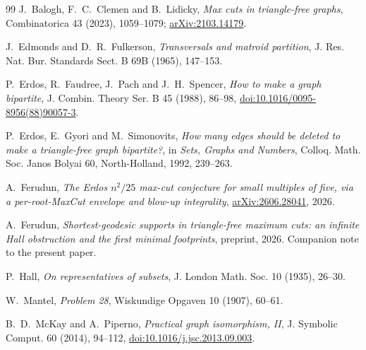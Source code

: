 \documentclass[11pt]{article}
\theoremstyle{definition}
\begin{document}
\begin{thebibliography}{99}
J.~Balogh, F.~C.~Clemen and B.~Lidicky,
\emph{Max cuts in triangle-free graphs},
Combinatorica 43 (2023), 1059--1079;
\href{https://arxiv.org/abs/2103.14179}{arXiv:2103.14179}.

J.~Edmonds and D.~R.~Fulkerson,
\emph{Transversals and matroid partition},
J. Res. Nat. Bur. Standards Sect. B 69B (1965), 147--153.

P.~Erdos, R.~Faudree, J.~Pach and J.~H.~Spencer,
\emph{How to make a graph bipartite},
J. Combin. Theory Ser. B 45 (1988), 86--98,
\href{https://doi.org/10.1016/0095-8956(88)90057-3}{doi:10.1016/0095-8956(88)90057-3}.

P.~Erdos, E.~Gyori and M.~Simonovits,
\emph{How many edges should be deleted to make a triangle-free graph
bipartite?},
in \emph{Sets, Graphs and Numbers}, Colloq. Math. Soc. Janos Bolyai 60,
North-Holland, 1992, 239--263.

A.~Ferudun,
\emph{The Erdos \(n^2/25\) max-cut conjecture for small multiples of five,
via a per-root-MaxCut envelope and blow-up integrality},
\href{https://arxiv.org/abs/2606.28041}{arXiv:2606.28041}, 2026.

A.~Ferudun,
\emph{Shortest-geodesic supports in triangle-free maximum cuts: an
infinite Hall obstruction and the first minimal footprints},
preprint, 2026. Companion note to the present paper.

P.~Hall,
\emph{On representatives of subsets},
J. London Math. Soc. 10 (1935), 26--30.

W.~Mantel,
\emph{Problem 28},
Wiskundige Opgaven 10 (1907), 60--61.

B.~D.~McKay and A.~Piperno,
\emph{Practical graph isomorphism, II},
J. Symbolic Comput. 60 (2014), 94--112,
\href{https://doi.org/10.1016/j.jsc.2013.09.003}{doi:10.1016/j.jsc.2013.09.003}.
\end{thebibliography}
\end{document}
